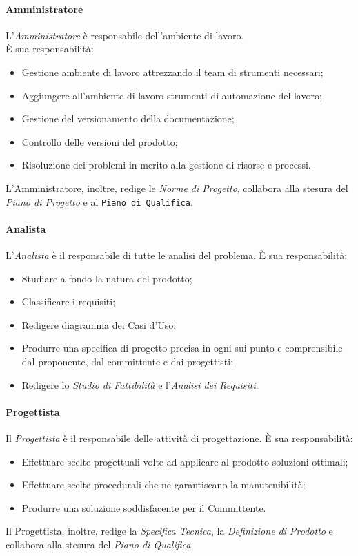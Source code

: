         \paragraph{Amministratore}
          L'\emph{Amministratore} è responsabile dell'ambiente di lavoro.\\
          È sua responsabilità:
          \begin{itemize}
            \item Gestione ambiente di lavoro attrezzando il team di strumenti necessari;
            \item Aggiungere all’ambiente di lavoro strumenti di automazione del lavoro;
            \item Gestione del versionamento della documentazione;
            \item Controllo delle versioni del prodotto;
            \item Risoluzione dei problemi in merito alla gestione di risorse e processi.
          \end{itemize}
          L'Amministratore, inoltre, redige le \emph{Norme di Progetto}, collabora alla stesura del \emph{Piano di Progetto} e al \texttt{Piano di Qualifica}.
        \paragraph{Analista}
          L'\emph{Analista} è il responsabile di tutte le analisi del problema.
          È sua responsabilità:
          \begin{itemize}
            \item Studiare a fondo la natura del prodotto;
            \item Classificare i requisiti;
            \item Redigere diagramma dei Casi d'Uso;
            \item Produrre una specifica di progetto precisa in ogni sui punto e comprensibile dal proponente, dal committente e dai progettisti;
            \item Redigere lo \emph{Studio di Fattibilità} e l'\emph{Analisi dei Requisiti}.
          \end{itemize}
        \paragraph{Progettista}
          Il \emph{Progettista} è il responsabile delle attività di progettazione.
          È sua responsabilità:
          \begin{itemize}
            \item Effettuare scelte progettuali volte ad applicare al prodotto soluzioni ottimali;
            \item Effettuare scelte procedurali che ne garantiscano la manutenibilità;
            \item Produrre una soluzione soddisfacente per il Committente.
          \end{itemize}
          Il Progettista, inoltre, redige la \emph{Specifica Tecnica}, la \emph{Definizione di Prodotto} e collabora alla stesura del \emph{Piano di Qualifica}.
